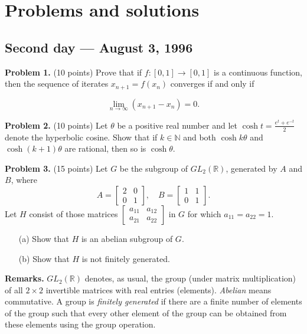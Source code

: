 \documentclass{article}
\begin{document}
\pagestyle{plain}

\section*{Problems and solutions}

\subsection*{Second day — August 3, 1996}

\textbf{Problem 1.} (10 points)
Prove that if \( f : [0,1] \to [0,1] \) is a continuous function, then the sequence of iterates \( x_{n+1} = f(x_n) \) converges if and only if

\[
\lim_{n \to \infty} (x_{n+1} - x_n) = 0.
\]

\textbf{Problem 2.} (10 points)
Let \(\theta\) be a positive real number and let \(\cosh t = \frac{e^t + e^{-t}}{2}\) denote the hyperbolic cosine. Show that if \(k \in \mathbb{N}\) and both \(\cosh k\theta\) and \(\cosh (k + 1)\theta\) are rational, then so is \(\cosh \theta\).

\textbf{Problem 3.} (15 points)
Let \( G \) be the subgroup of \( GL_2(\mathbb{R}) \), generated by \( A \) and \( B \), where
\[
A = \begin{bmatrix}
2 & 0 \\
0 & 1
\end{bmatrix}, \quad B = \begin{bmatrix}
1 & 1 \\
0 & 1
\end{bmatrix}.
\]
Let \( H \) consist of those matrices \( \begin{bmatrix}
a_{11} & a_{12} \\
a_{21} & a_{22}
\end{bmatrix} \) in \( G \) for which \( a_{11}=a_{22}=1 \).

\begin{itemize}
    \item[(a)] Show that \( H \) is an abelian subgroup of \( G \).
    \item[(b)] Show that \( H \) is not finitely generated.
\end{itemize}

\textbf{Remarks.} \( GL_2(\mathbb{R}) \) denotes, as usual, the group (under matrix multiplication) of all \( 2 \times 2 \) invertible matrices with real entries (elements). \textit{Abelian} means commutative. A group is \textit{finitely generated} if there are a finite number of elements of the group such that every other element of the group can be obtained from these elements using the group operation.
\end{document}
